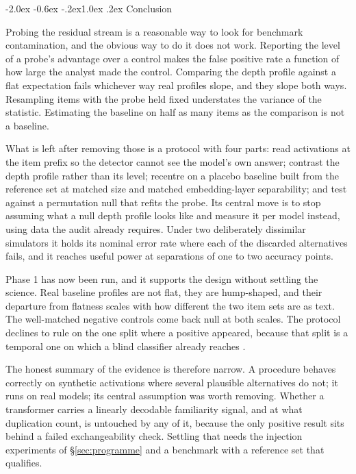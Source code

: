 \documentclass[10pt,twocolumn,letterpaper]{article}
\makeatletter
\renewcommand\section{\@startsection{section}{1}{\z@}%
  {-2.0ex \@plus -0.6ex \@minus -.2ex}{1.0ex \@plus .2ex}%
  {\normalfont\large\bfseries}}
\makeatother
\begin{document}
\section{Conclusion}

Probing the residual stream is a reasonable way to look for benchmark
contamination, and the obvious way to do it does not work. Reporting the level
of a probe's advantage over a control makes the false positive rate a function
of how large the analyst made the control. Comparing the depth profile against
a flat expectation fails whichever way real profiles slope, and they slope both
ways. Resampling items with the probe held fixed understates the variance of
the statistic. Estimating the baseline on half as many items as the comparison
is not a baseline.

What is left after removing those is a protocol with four parts: read
activations at the item prefix so the detector cannot see the model's own
answer; contrast the depth profile rather than its level; recentre on a
placebo baseline built from the reference set at matched size and matched
embedding-layer separability; and test against a permutation null that refits
the probe. Its central move is to stop assuming what a null depth profile looks
like and measure it per model instead, using data the audit already requires.
Under two deliberately dissimilar simulators it holds its nominal error rate
where each of the discarded alternatives fails, and it reaches useful power at
separations of one to two accuracy points.

Phase 1 has now been run, and it supports the design without settling the
science. Real baseline profiles are not flat, they are hump-shaped, and their
departure from flatness scales with how different the two item sets are as
text. The well-matched negative controls come back null at both scales. The
protocol declines to rule on the one split where a positive appeared, because
that split is a temporal one on which a blind classifier already reaches
\PoneWkNuisHi{}.

The honest summary of the evidence is therefore narrow. A procedure behaves
correctly on synthetic activations where several plausible alternatives do not;
it runs on real models; its central assumption was worth removing. Whether a
transformer carries a linearly decodable familiarity signal, and at what
duplication count, is untouched by any of it, because the only positive result
sits behind a failed exchangeability check. Settling that needs the injection
experiments of \S\ref{sec:programme} and a benchmark with a reference set that
qualifies.
\end{document}
